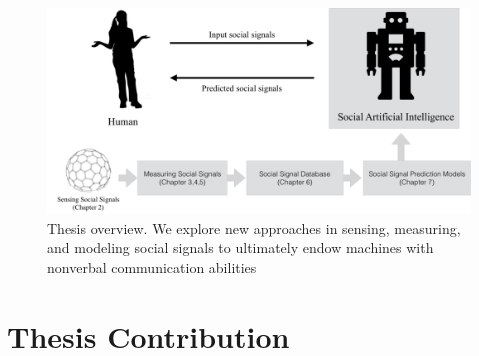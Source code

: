 \begin{figure}[t]
	\centering
	\includegraphics[trim=0 0 0 0, clip=true, width=\textwidth]{figures/intro_framework}
	\caption{Thesis overview. We explore new approaches in sensing, measuring, and modeling social signals to ultimately endow machines with nonverbal communication abilities}	
	\label{fig:thesis_overview}
\end{figure}



\section{Thesis Contribution}

